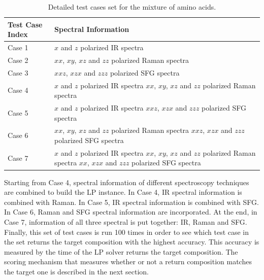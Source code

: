 \begin{table}[ht!]
\begin{center}
{\def\arraystretch{1.5}
\begin{tabular}{| l | p{3in} | }
\hline
Test Case Index & Spectral Information \\
\hline
Case 1 & $x$ and $z$ polarized IR spectra\\
\hline
Case 2 & $xx$, $xy$, $xz$ and $zz$ polarized Raman spectra \\
\hline
Case 3 & $xxz$, $xzx$ and $zzz$ polarized SFG spectra \\
\hline
Case 4 & $x$ and $z$ polarized IR spectra \newline $xx$, $xy$, $xz$ and $zz$ polarized Raman spectra \\
\hline
Case 5 & $x$ and $z$ polarized IR spectra \newline $xxz$, $xzx$ and $zzz$ polarized SFG spectra　\\
\hline
Case 6 & $xx$, $xy$, $xz$ and $zz$ polarized Raman spectra \newline $xxz$, $xzx$ and $zzz$ polarized SFG spectra \\
\hline
Case 7 & $x$ and $z$ polarized IR spectra \newline
 $xx$, $xy$, $xz$ and $zz$ polarized Raman spectra \newline 
 $xx$, $xzx$ and $zzz$ polarized SFG spectra \\
\hline
\end{tabular} 
}
\end{center}
\caption{Detailed test cases set for the mixture of amino acids.} 
\label{tab:5.1} 
\end{table}	

Starting from Case 4, spectral information of different spectroscopy techniques are combined to build the LP instance. In Case 4, IR spectral information is combined with Raman. In Case 5, IR spectral information is combined with SFG. In Case 6, Raman and SFG spectral information are incorporated. At the end, in Case 7, information of all three spectral is put together: IR, Raman and SFG. \\

Finally, this set of test cases is run 100 times in order to see which test case in the set returns the target composition with the highest accuracy. This accuracy is measured by the time of the LP solver returns the target composition. The scoring mechanism that measures whether or not a return composition matches the target one is described in the next section. \\

